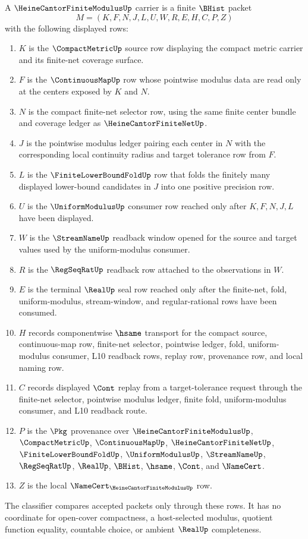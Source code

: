 \begin{definition}
\label{def:heine-cantor-finite-modulus-carrier}
A $\HeineCantorFiniteModulusUp$ carrier is a finite $\BHist$ packet
$$
M=(K,F,N,J,L,U,W,R,E,H,C,P,Z)
$$
with the following displayed rows:
\begin{enumerate}
\item $K$ is the $\CompactMetricUp$ source row displaying the compact metric carrier and its finite-net coverage surface.
\item $F$ is the $\ContinuousMapUp$ row whose pointwise modulus data are read only at the centers exposed by $K$ and $N$.
\item $N$ is the compact finite-net selector row, using the same finite center bundle and coverage ledger as $\HeineCantorFiniteNetUp$.
\item $J$ is the pointwise modulus ledger pairing each center in $N$ with the corresponding local continuity radius and target tolerance row from $F$.
\item $L$ is the $\FiniteLowerBoundFoldUp$ row that folds the finitely many displayed lower-bound candidates in $J$ into one positive precision row.
\item $U$ is the $\UniformModulusUp$ consumer row reached only after $K,F,N,J,L$ have been displayed.
\item $W$ is the $\StreamNameUp$ readback window opened for the source and target values used by the uniform-modulus consumer.
\item $R$ is the $\RegSeqRatUp$ readback row attached to the observations in $W$.
\item $E$ is the terminal $\RealUp$ seal row reached only after the finite-net, fold, uniform-modulus, stream-window, and regular-rational rows have been consumed.
\item $H$ records componentwise $\hsame$ transport for the compact source, continuous-map row, finite-net selector, pointwise ledger, fold, uniform-modulus consumer, L10 readback rows, replay row, provenance row, and local naming row.
\item $C$ records displayed $\Cont$ replay from a target-tolerance request through the finite-net selector, pointwise modulus ledger, finite fold, uniform-modulus consumer, and L10 readback route.
\item $P$ is the $\Pkg$ provenance over $\HeineCantorFiniteModulusUp$, $\CompactMetricUp$, $\ContinuousMapUp$, $\HeineCantorFiniteNetUp$, $\FiniteLowerBoundFoldUp$, $\UniformModulusUp$, $\StreamNameUp$, $\RegSeqRatUp$, $\RealUp$, $\BHist$, $\hsame$, $\Cont$, and $\NameCert$.
\item $Z$ is the local $\NameCert_{\HeineCantorFiniteModulusUp}$ row.
\end{enumerate}
The classifier compares accepted packets only through these rows. It has no coordinate for open-cover compactness, a host-selected modulus, quotient function equality, countable choice, or ambient $\RealUp$ completeness.
\end{definition}


